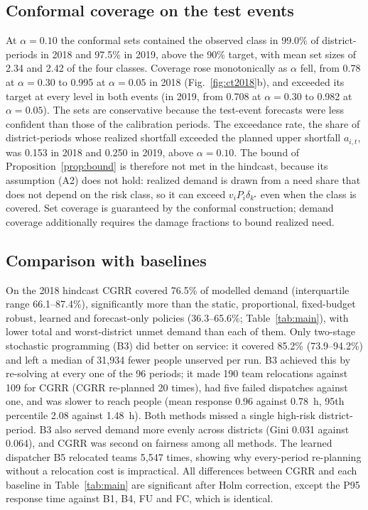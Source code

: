 \documentclass[pdflatex,sn-basic]{sn-jnl}
\theoremstyle{plain}%
\theoremstyle{remark}%
\theoremstyle{definition}%
\begin{document}
\subsection{Conformal coverage on the test events}

At $\alpha = 0.10$ the conformal sets contained the observed class in 99.0\% of district-periods in 2018 and 97.5\% in 2019, above the 90\% target, with mean set sizes of 2.34 and 2.42 of the four classes. Coverage rose monotonically as $\alpha$ fell, from 0.78 at $\alpha = 0.30$ to 0.995 at $\alpha = 0.05$ in 2018 (Fig.~\ref{fig:ct2018}b), and exceeded its target at every level in both events (in 2019, from 0.708 at $\alpha = 0.30$ to 0.982 at $\alpha = 0.05$). The sets are conservative because the test-event forecasts were less confident than those of the calibration periods. The exceedance rate, the share of district-periods whose realized shortfall exceeded the planned upper shortfall $a_{i,t}$, was 0.153 in 2018 and 0.250 in 2019, above $\alpha = 0.10$. The bound of Proposition~\ref{prop:bound} is therefore not met in the hindcast, because its assumption (A2) does not hold: realized demand is drawn from a need share that does not depend on the risk class, so it can exceed $v_i P_i \delta_{k^\star}$ even when the class is covered. Set coverage is guaranteed by the conformal construction; demand coverage additionally requires the damage fractions to bound realized need.

\subsection{Comparison with baselines}

On the 2018 hindcast CGRR covered 76.5\% of modelled demand (interquartile range 66.1--87.4\%), significantly more than the static, proportional, fixed-budget robust, learned and forecast-only policies (36.3--65.6\%; Table~\ref{tab:main}), with lower total and worst-district unmet demand than each of them. Only two-stage stochastic programming (B3) did better on service: it covered 85.2\% (73.9--94.2\%) and left a median of 31,934 fewer people unserved per run. B3 achieved this by re-solving at every one of the 96 periods; it made 190 team relocations against 109 for CGRR (CGRR re-planned 20 times), had five failed dispatches against one, and was slower to reach people (mean response 0.96 against 0.78~h, 95th percentile 2.08 against 1.48~h). Both methods missed a single high-risk district-period. B3 also served demand more evenly across districts (Gini 0.031 against 0.064), and CGRR was second on fairness among all methods. The learned dispatcher B5 relocated teams 5,547 times, showing why every-period re-planning without a relocation cost is impractical. All differences between CGRR and each baseline in Table~\ref{tab:main} are significant after Holm correction, except the P95 response time against B1, B4, FU and FC, which is identical.
\end{document}
